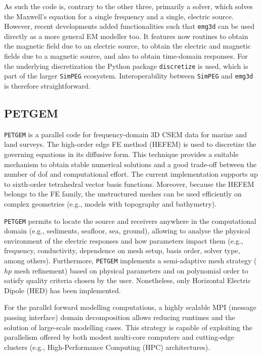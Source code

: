 \documentclass[
    paper,
  ]{geophysics}
\newcommand{\emg}[2]{\texttt{emg#1#2}\xspace}
\newcommand{\simpeg}{\texttt{SimPEG}\xspace}
\newcommand{\discretize}{\texttt{discretize}\xspace}
\newcommand{\petgem}{\texttt{PETGEM}\xspace}
\begin{document}
As such the code is, contrary to the other three, primarily a solver, which solves the Maxwell's equation for a single frequency and a single, electric source. However, recent developments added functionalities such that \emg3d can be used directly as a more general EM modeller too. It features now routines to obtain the magnetic field due to an electric source, to obtain the electric and magnetic fields due to a magnetic source, and also to obtain time-domain responses. For the underlying discretization the Python package \discretize is used, which is part of the larger \simpeg ecosystem. Interoperability between \simpeg and \emg3d is therefore straightforward.

\subsection{PETGEM}

\petgem is a parallel code for frequency-domain 3D CSEM data for marine and land surveys. The high-order edge FE method (HEFEM) is used to discretize the governing equations in its diffusive form. This technique provides a suitable mechanism to obtain stable numerical solutions and a good trade-off between the number of dof and computational effort. The current implementation supports up to sixth-order tetrahedral vector basis functions. Moreover, because the HEFEM belongs to the FE family, the unstructured meshes can be used efficiently on complex geometries (e.g., models with topography and bathymetry).

\petgem permits to locate the source and receivers anywhere in the computational domain (e.g., sediments, seafloor, sea, ground), allowing to analyse the physical environment of the electric responses and how parameters impact them (e.g., frequency, conductivity, dependence on mesh setup, basis order, solver type, among others). Furthermore, \petgem implements a semi-adaptive mesh strategy ($hp$ mesh refinement) based on physical parameters and on polynomial order to satisfy quality criteria chosen by the user. Nonetheless, only Horizontal Electric Dipole (HED) has been implemented.

For the parallel forward modelling computations, a highly scalable MPI (message passing interface) domain decomposition allows reducing runtimes and the solution of large-scale modelling cases. This strategy is capable of exploiting the parallelism offered by both modest multi-core computers and cutting-edge clusters (e.g., High-Performance Computing (HPC) architectures).
\end{document}
